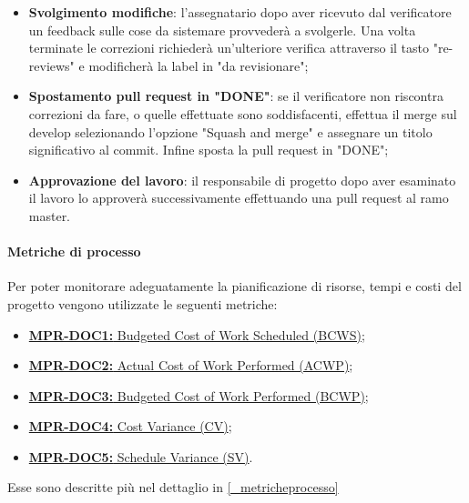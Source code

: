 \begin{itemize}
    \item \textbf{Svolgimento modifiche}: l'assegnatario dopo aver ricevuto dal verificatore un feedback sulle cose da sistemare provvederà a svolgerle. Una volta terminate le correzioni richiederà un'ulteriore verifica attraverso il tasto "re-reviews" e modificherà la label in "da revisionare";
    \item \textbf{Spostamento pull request in "DONE"}: se il verificatore non riscontra correzioni da fare, o quelle effettuate sono soddisfacenti, effettua il merge sul develop selezionando l'opzione "Squash and merge" e assegnare un titolo significativo al commit. Infine sposta la pull request in "DONE";
    \item \textbf{Approvazione del lavoro}: il responsabile di progetto dopo aver esaminato il lavoro lo approverà successivamente effettuando una pull request al ramo master.
\end{itemize}
\paragraph{Metriche di processo}
Per poter monitorare adeguatamente la pianificazione di risorse, tempi e costi del progetto vengono utilizzate le seguenti metriche:
\begin{itemize}
    \item \hyperref[_MPR-DOC1]{\textbf{MPR-DOC1:} Budgeted Cost of Work Scheduled (BCWS)};
    \item \hyperref[_MPR-DOC2]{\textbf{MPR-DOC2:} Actual Cost of Work Performed (ACWP)};
    \item \hyperref[_MPR-DOC3]{\textbf{MPR-DOC3:} Budgeted Cost of Work Performed (BCWP)};
    \item \hyperref[_MPR-DOC4]{\textbf{MPR-DOC4:} Cost Variance (CV)};
    \item \hyperref[_MPR-DOC5]{\textbf{MPR-DOC5:} Schedule Variance (SV)}.
\end{itemize}
Esse sono descritte più nel dettaglio in \ref{_metricheprocesso}
